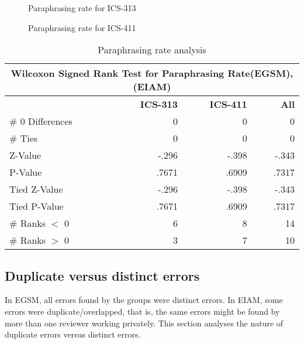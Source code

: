 \begin{figure}[htb]
 {\centerline{}}
 \caption{Paraphrasing rate for ICS-313}
 \label{paraphrasing-313}
\end{figure}


\begin{figure}[htb]
 {\centerline{}}
 \caption{Paraphrasing rate for ICS-411}
 \label{paraphrasing-411}
\end{figure}

     
\begin{table}[htb]
 \caption{Paraphrasing rate analysis }
 \begin{center}
 \begin{tabular}{|l|r|r|r|}
  \hline
  \multicolumn{4}{|c|}{\bf Wilcoxon Signed Rank Test for Paraphrasing
  Rate(EGSM), (EIAM)}\\
  \hline
  & {\bf ICS-313} & {\bf ICS-411} & {\bf All} \\ 
  \hline
  \# 0 Differences & 0 & 0 & 0\\
  \# Ties & 0 & 0 & 0\\
  Z-Value & -.296 & -.398 & -.343\\
  P-Value & .7671 & .6909 & .7317\\
  Tied Z-Value & -.296 & -.398 & -.343\\
  Tied P-Value & .7671 & .6909 & .7317\\
  \# Ranks $<$ 0 & 6 & 8 & 14\\
  \# Ranks $>$ 0 & 3 & 7 & 10\\
  \hline
  \end{tabular}
  \end{center}
  \label{paraphrasing-rate-analysis}
\end{table} 


\subsection {Duplicate versus distinct errors}

In EGSM, all errors found by the  groups were distinct errors. In
EIAM,  some errors were duplicate/overlapped, that is, the same errors
might be found by more than one reviewer working privately.
This section analyses the nature of duplicate errors versus
distinct errors.


